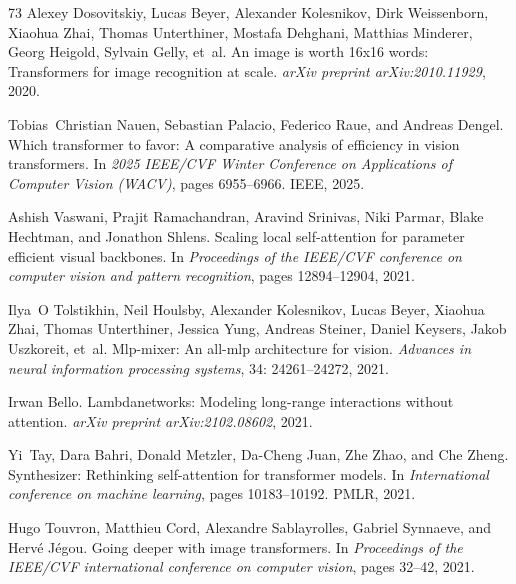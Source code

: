 \documentclass{article}
\begin{document}
\begin{thebibliography}{73}
Alexey Dosovitskiy, Lucas Beyer, Alexander Kolesnikov, Dirk Weissenborn,
  Xiaohua Zhai, Thomas Unterthiner, Mostafa Dehghani, Matthias Minderer, Georg
  Heigold, Sylvain Gelly, et~al.
\newblock An image is worth 16x16 words: Transformers for image recognition at
  scale.
\newblock \emph{arXiv preprint arXiv:2010.11929}, 2020.

Tobias~Christian Nauen, Sebastian Palacio, Federico Raue, and Andreas Dengel.
\newblock Which transformer to favor: A comparative analysis of efficiency in
  vision transformers.
\newblock In \emph{2025 IEEE/CVF Winter Conference on Applications of Computer
  Vision (WACV)}, pages 6955--6966. IEEE, 2025.

Ashish Vaswani, Prajit Ramachandran, Aravind Srinivas, Niki Parmar, Blake
  Hechtman, and Jonathon Shlens.
\newblock Scaling local self-attention for parameter efficient visual
  backbones.
\newblock In \emph{Proceedings of the IEEE/CVF conference on computer vision
  and pattern recognition}, pages 12894--12904, 2021.

Ilya~O Tolstikhin, Neil Houlsby, Alexander Kolesnikov, Lucas Beyer, Xiaohua
  Zhai, Thomas Unterthiner, Jessica Yung, Andreas Steiner, Daniel Keysers,
  Jakob Uszkoreit, et~al.
\newblock Mlp-mixer: An all-mlp architecture for vision.
\newblock \emph{Advances in neural information processing systems},
  34: 24261--24272, 2021.

Irwan Bello.
\newblock Lambdanetworks: Modeling long-range interactions without attention.
\newblock \emph{arXiv preprint arXiv:2102.08602}, 2021.

Yi~Tay, Dara Bahri, Donald Metzler, Da-Cheng Juan, Zhe Zhao, and Che Zheng.
\newblock Synthesizer: Rethinking self-attention for transformer models.
\newblock In \emph{International conference on machine learning}, pages
  10183--10192. PMLR, 2021.

Hugo Touvron, Matthieu Cord, Alexandre Sablayrolles, Gabriel Synnaeve, and
  Herv{\'e} J{\'e}gou.
\newblock Going deeper with image transformers.
\newblock In \emph{Proceedings of the IEEE/CVF international conference on
  computer vision}, pages 32--42, 2021{}.


\end{thebibliography}
\end{document}
